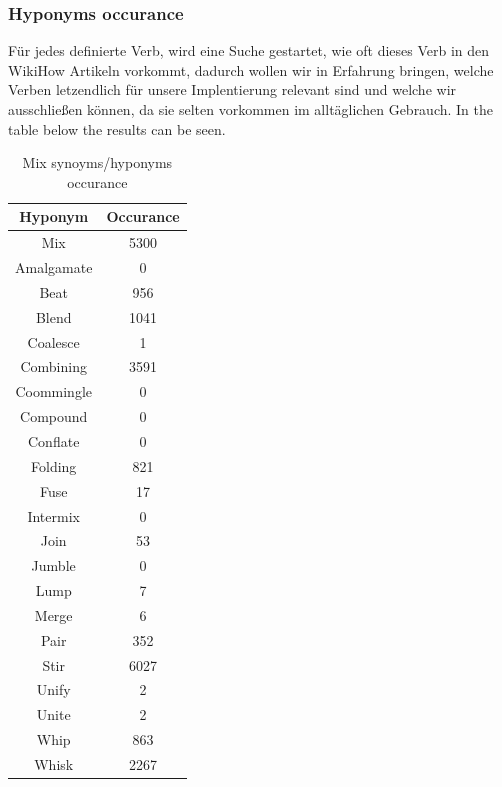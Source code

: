   \subsubsection*{Hyponyms occurance}
  Für jedes definierte Verb, wird eine Suche gestartet, wie oft dieses Verb in den WikiHow Artikeln vorkommt, dadurch wollen wir in Erfahrung bringen, welche Verben letzendlich für unsere Implentierung relevant sind und welche wir ausschließen können, da sie selten vorkommen im alltäglichen Gebrauch.
  In the table below the results can be seen.
    \begin{table}[H]
        \centering
        \begin{tabular}{|c|c|}
          \hline
          \textbf{Hyponym} & \textbf{Occurance}  \\
          \hline
          Mix & 5300 \\
          \hline
          Amalgamate & 0 \\
          \hline
          Beat & 956 \\
          \hline
          Blend & 1041 \\
          \hline
          Coalesce & 1 \\
          \hline
          Combining & 3591  \\
          \hline
          Coommingle & 0 \\
          \hline
          Compound & 0 \\
          \hline
          Conflate & 0 \\
          \hline
          Folding & 821 \\
          \hline
          Fuse & 17 \\
          \hline
          Intermix & 0 \\
          \hline
          Join & 53 \\
          \hline
          Jumble & 0 \\
          \hline
          Lump & 7 \\
          \hline
          Merge & 6 \\
          \hline
          Pair & 352 \\
          \hline
          Stir & 6027 \\
          \hline
          Unify & 2 \\
          \hline
          Unite & 2 \\
          \hline
          Whip & 863 \\
          \hline
          Whisk & 2267 \\
          \hline
          
    
        \end{tabular}
        \caption{Mix synoyms/hyponyms occurance}
        \label{tab:example}
      \end{table}
      
